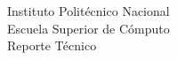 
\begin{titlepage}
    
  \begin{center}
    \LARGE{Instituto Polit\'ecnico Nacional\\}
    \vspace{1cm}
    \LARGE{Escuela Superior de C\'omputo \\}
    \vspace{1cm}
    \LARGE{Reporte T\'ecnico\\}
  \end{center}

\end{titlepage}
